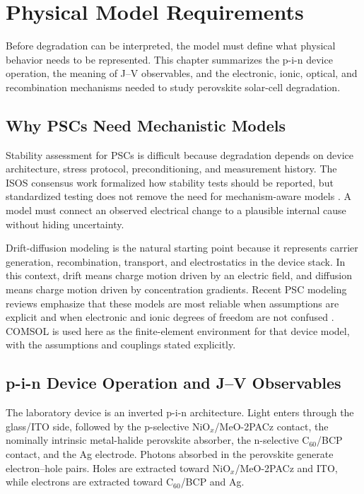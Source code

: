 \chapter{Physical Model Requirements}

Before degradation can be interpreted, the model must define what physical
behavior needs to be represented. This chapter summarizes the p-i-n device
operation, the meaning of J--V observables, and the electronic, ionic, optical,
and recombination mechanisms needed to study perovskite solar-cell degradation.

\section{Why PSCs Need Mechanistic Models}

Stability assessment for PSCs is difficult because degradation depends on
device architecture, stress protocol, preconditioning, and measurement history.
The ISOS consensus work formalized how stability tests should be reported, but
standardized testing does not remove the need for mechanism-aware models
\cite{Khenkin_2020}. A model must connect an observed electrical change to a
plausible internal cause without hiding uncertainty.

Drift-diffusion modeling is the natural starting point because it represents
carrier generation, recombination, transport, and electrostatics in the device
stack. In this context, drift means charge motion driven by an electric field,
and diffusion means charge motion driven by concentration gradients. Recent PSC
modeling reviews emphasize that these models are most reliable when
assumptions are explicit and when electronic and ionic degrees of freedom are not confused
\cite{Singh_2025}. COMSOL is used here as the finite-element environment for
that device model, with the assumptions and couplings stated explicitly.

\section{p-i-n Device Operation and J--V Observables}

The laboratory device is an inverted p-i-n architecture. Light enters through
the glass/ITO side, followed by the p-selective NiO$_x$/MeO-2PACz contact,
the nominally intrinsic metal-halide perovskite absorber, the n-selective
C$_{60}$/BCP contact, and the Ag electrode. Photons absorbed in the
perovskite generate electron--hole pairs. Holes are extracted toward
NiO$_x$/MeO-2PACz and ITO, while electrons are extracted toward C$_{60}$/BCP
and Ag.

